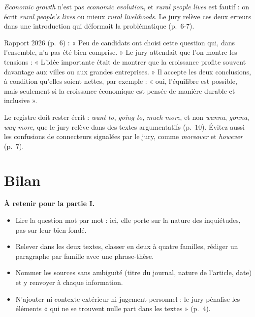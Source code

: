 \documentclass[11pt,a4paper]{article}
\providecommand{\tightlist}{\setlength{\itemsep}{0pt}\setlength{\parskip}{0pt}}
\begin{document}
\begin{piege}

\emph{Economic growth} n'est pas \emph{economic evolution}, et \emph{rural people lives} est fautif : on écrit \emph{rural people's lives} ou mieux \emph{rural livelihoods}. Le jury relève ces deux erreurs dans une introduction qui déformait la problématique (p.~6-7).

\end{piege}

\begin{jury}

Rapport 2026 (p.~6) : « Peu de candidats ont choisi cette question qui, dans l'ensemble, n'a pas été bien comprise. » Le jury attendait que l'on montre les tensions : « L'idée importante était de montrer que la croissance profite souvent davantage aux villes ou aux grandes entreprises. » Il accepte les deux conclusions, à condition qu'elles soient nettes, par exemple : « oui, l'équilibre est possible, mais seulement si la croissance économique est pensée de manière durable et inclusive ».

\end{jury}

\begin{piege}

Le registre doit rester écrit : \emph{want to}, \emph{going to}, \emph{much more}, et non \emph{wanna}, \emph{gonna}, \emph{way more}, que le jury relève dans des textes argumentatifs (p.~10). Évitez aussi les confusions de connecteurs signalées par le jury, comme \emph{moreover} et \emph{however} (p.~7).

\end{piege}

\hypertarget{bilan}{%
\section{Bilan}\label{bilan}}

\textbf{À retenir pour la partie I.}

\begin{itemize}
\tightlist
\item
  Lire la question mot par mot : ici, elle porte sur la nature des inquiétudes, pas sur leur bien-fondé.
\item
  Relever dans les deux textes, classer en deux à quatre familles, rédiger un paragraphe par famille avec une phrase-thèse.
\item
  Nommer les sources sans ambiguïté (titre du journal, nature de l'article, date) et y renvoyer à chaque information.
\item
  N'ajouter ni contexte extérieur ni jugement personnel : le jury pénalise les éléments « qui ne se trouvent nulle part dans les textes » (p.~4).
\end{itemize}
\end{document}
